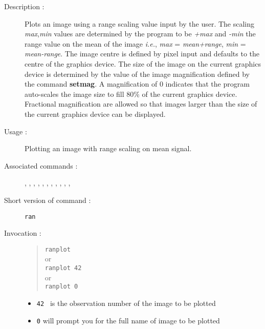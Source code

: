 \begin{description}

\item[Description :] Plots an image using a range scaling value input
by the user.  The scaling {\it max},{\it min} values are determined by
the program to be {\it +max} and {\it -min} the range value on
the mean of the image \emph{i.e.}, {\it max} = {\it mean+range}, {\it min} =
{\it mean-range}. The image centre is defined by pixel input and defaults to
the centre of the graphics device. The size of the image on the current
graphics device is determined by the value of the image magnification
defined by the command {\bf setmag}.  A magnification of 0 indicates that the
program auto-scales the image size to fill 80\% of the current graphics
device.  Fractional magnification are allowed so that images larger
than the size of the current graphics device can be displayed.

\item[Usage :] Plotting an image with range scaling on mean signal.

\item[Associated commands :] {\tt {}},
{\tt {}}, {\tt {}},
{\tt {}}, {\tt {}},
{\tt {}}, {\tt {}},
{\tt {}}, {\tt {}},
{\tt {}}, {\tt {}},
{\tt {}}

\item[Short version of command :] {\tt ran}
\item[Invocation :]

\begin{quote}{\tt  ranplot }\\
or \\
{\tt ranplot 42 }\\
or \\
{\tt ranplot 0 }
\end{quote}

\begin{itemize}
\item {\tt 42 } is the observation number of the image to be plotted
\item {\tt 0} will prompt you for the full name of image to be plotted
\end{itemize}

\end{description}

